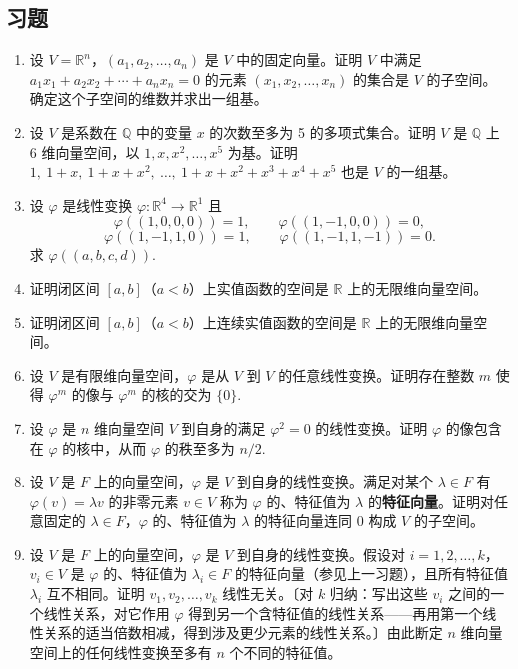 \subsection*{习题}

\begin{enumerate}
\item 设 \(V = \mathbb{R}^n\)，\((a_1, a_2, \ldots, a_n)\) 是 \(V\) 中的固定向量。证明 \(V\) 中满足 \(a_1x_1+a_2x_2+\cdots+a_nx_n = 0\) 的元素 \((x_1, x_2, \ldots, x_n)\) 的集合是 \(V\) 的子空间。确定这个子空间的维数并求出一组基。

\item 设 \(V\) 是系数在 \(\mathbb{Q}\) 中的变量 \(x\) 的次数至多为 5 的多项式集合。证明 \(V\) 是 \(\mathbb{Q}\) 上 6 维向量空间，以 \(1, x, x^2, \ldots, x^5\) 为基。证明 \(1,\ 1+x,\ 1+x+x^2,\ \ldots,\ 1+x+x^2+x^3+x^4+x^5\) 也是 \(V\) 的一组基。

\item 设 \(\varphi\) 是线性变换 \(\varphi : \mathbb{R}^4 \to \mathbb{R}^1\) 且
\[
\varphi((1,0,0,0)) = 1, \qquad \varphi((1,-1,0,0)) = 0,
\]
\[
\varphi((1,-1,1,0)) = 1, \qquad \varphi((1,-1,1,-1)) = 0.
\]
求 \(\varphi((a, b, c, d))\).

\item 证明闭区间 \([a, b]\)（\(a < b\)）上实值函数的空间是 \(\mathbb{R}\) 上的无限维向量空间。

\item 证明闭区间 \([a, b]\)（\(a < b\)）上连续实值函数的空间是 \(\mathbb{R}\) 上的无限维向量空间。

\item 设 \(V\) 是有限维向量空间，\(\varphi\) 是从 \(V\) 到 \(V\) 的任意线性变换。证明存在整数 \(m\) 使得 \(\varphi^m\) 的像与 \(\varphi^m\) 的核的交为 \(\{0\}\).

\item 设 \(\varphi\) 是 \(n\) 维向量空间 \(V\) 到自身的满足 \(\varphi^2 = 0\) 的线性变换。证明 \(\varphi\) 的像包含在 \(\varphi\) 的核中，从而 \(\varphi\) 的秩至多为 \(n/2\).

\item 设 \(V\) 是 \(F\) 上的向量空间，\(\varphi\) 是 \(V\) 到自身的线性变换。满足对某个 \(\lambda \in F\) 有 \(\varphi(v) = \lambda v\) 的非零元素 \(v \in V\) 称为 \(\varphi\) 的、特征值为 \(\lambda\) 的\textbf{特征向量}。证明对任意固定的 \(\lambda \in F\)，\(\varphi\) 的、特征值为 \(\lambda\) 的特征向量连同 0 构成 \(V\) 的子空间。

\item 设 \(V\) 是 \(F\) 上的向量空间，\(\varphi\) 是 \(V\) 到自身的线性变换。假设对 \(i = 1, 2, \ldots, k\)，\(v_i \in V\) 是 \(\varphi\) 的、特征值为 \(\lambda_i \in F\) 的特征向量（参见上一习题），且所有特征值 \(\lambda_i\) 互不相同。证明 \(v_1, v_2, \ldots, v_k\) 线性无关。〔对 \(k\) 归纳：写出这些 \(v_i\) 之间的一个线性关系，对它作用 \(\varphi\) 得到另一个含特征值的线性关系——再用第一个线性关系的适当倍数相减，得到涉及更少元素的线性关系。〕由此断定 \(n\) 维向量空间上的任何线性变换至多有 \(n\) 个不同的特征值。
\end{enumerate}

